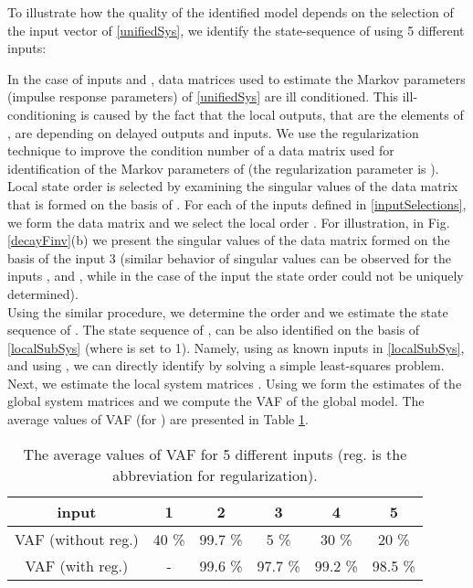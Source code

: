 \documentclass[journal,10pt]{IEEEtran}
\begin{document}
 To illustrate how the quality of the identified model depends on the selection of the input vector of \eqref{unifiedSys}, we identify the state-sequence of  using 5 different inputs:
\begin{small}

\end{small}
In the case of inputs  and , data matrices used to estimate the Markov parameters (impulse response parameters) of \eqref{unifiedSys} are ill conditioned. This ill-conditioning is caused by the fact that the local outputs, that are the elements of , are depending on delayed outputs and inputs. We use the regularization technique to improve the condition number of a data matrix used for identification of the Markov parameters of   (the regularization parameter is ). Local state order is selected by examining the singular values of the data matrix that is formed on the basis of . For each of the inputs defined in \eqref{inputSelections}, we form the data matrix and we select the local order . For illustration, in Fig. \ref{decayFinv}(b) we present the singular values of the data matrix formed on the basis of the input 3 (similar behavior of singular values can be observed for the inputs ,  and , while in the case of the input  the state order could not be uniquely determined). 
\\
Using the similar procedure, we determine the order and we estimate the state sequence of . The state sequence of , can be also identified on the basis of \eqref{localSubSys} (where  is set to 1). Namely, using  as known inputs in \eqref{localSubSys}, and using , we can directly identify  by solving a simple least-squares problem. \\
Next, we estimate the local system matrices . Using  we form the estimates of the global system matrices  and we compute the VAF of the global model. The average values of VAF (for ) are presented in Table \ref{tab:VAF}.
\par
\begin{tiny}\begin{table}[H]
\centering
\begin{tabular}{ |c | c | c | c |c|c|}
\hline
input                              &    1               &        2                &             3            &               4          &     5\\
\hline
VAF  (without reg.)                              &   40 \%          &         99.7 \%    &       5 \%             &           30 \%      &      20 \%  \\
\hline      
VAF (with reg.)        &     -              &          99.6 \%       &        97.7 \%         &         99.2 \%     &      98.5 \% \\
\hline
\end{tabular}
\caption{\small{The average values of VAF for 5 different inputs (reg. is the abbreviation for regularization).}}
\label{tab:VAF}
\end{table}\end{tiny}
\end{document}
